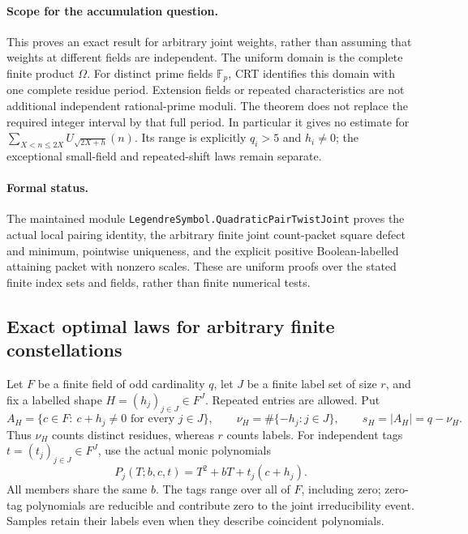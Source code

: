 \documentclass[11pt]{article}
\begin{document}
\paragraph{Scope for the accumulation question.}
This proves an exact result for arbitrary joint weights, rather than
assuming that weights at different fields are independent.
The uniform domain is the complete finite product \(\Omega\).
For distinct prime fields \(\mathbb F_p\), CRT identifies this domain
with one complete residue period. Extension fields or repeated
characteristics are not additional independent rational-prime moduli.
The theorem does not replace the required integer interval by that
full period. In particular it gives no estimate for
\(\sum_{X<n\le2X}U_{\sqrt{2X+h}}(n)\).
Its range is explicitly \(q_i>5\) and \(h_i\ne0\); the exceptional
small-field and repeated-shift laws remain separate.

\paragraph{Formal status.}
The maintained module
\texttt{LegendreSymbol.QuadraticPairTwistJoint}
proves the actual local pairing identity, the arbitrary finite joint
count-packet square defect and minimum, pointwise uniqueness, and the
explicit positive Boolean-labelled attaining packet with nonzero scales.
These are uniform proofs over the stated finite index sets and fields,
rather than finite numerical tests.

\subsection{Exact optimal laws for arbitrary finite constellations}

Let \(F\) be a finite field of odd cardinality \(q\), let \(J\) be
a finite label set of size \(r\), and fix a labelled shape
\(H=(h_j)_{j\in J}\in F^J\).
Repeated entries are allowed. Put
\[
 A_H=\{c\in F:\ c+h_j\ne0\text{ for every }j\in J\},\qquad
 \nu_H=\#\{-h_j:j\in J\},\qquad s_H=|A_H|=q-\nu_H.
\]
Thus \(\nu_H\) counts distinct residues, whereas \(r\) counts labels.
For independent tags \(t=(t_j)_{j\in J}\in F^J\), use the actual
monic polynomials
\[
                 P_j(T;b,c,t)=T^2+bT+t_j(c+h_j).
\]
All members share the same \(b\). The tags range over all of \(F\),
including zero; zero-tag polynomials are reducible and contribute zero
to the joint irreducibility event. Samples retain their labels even
when they describe coincident polynomials.
\end{document}
